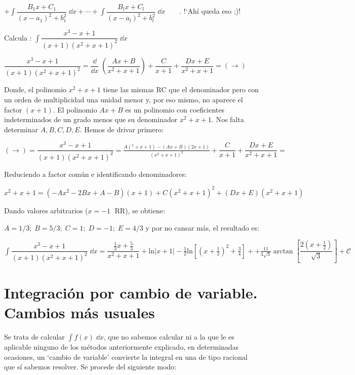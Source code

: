 {$\displaystyle +\int \dfrac {B_1x+C_1}{ (x-a_1)^2+b_1^2 } \; \dd x + \cdots + \int \dfrac {B_lx+C_l} {(x-a_l)^2+b_l^2}  \; \dd x \qquad $. \textcolor{gris}{!`Ahí queda eso ;)!}

\begin{ejem}
Calcula : $\displaystyle \int \dfrac {x^3-x+1}{(x+1)(x^2+x+1)^2} \; \dd x$	

\vspace{3mm}
$\displaystyle \dfrac {x^3-x+1}{(x+1)(x^2+x+1)^2}=\dfrac {\dd }{\dd x}\; \left( \dfrac {Ax+B}{x^2+x+1} \right) + \dfrac {C}{x+1} + \dfrac {Dx+E}{x^2+x+1}  = (\to) $

Donde, el polinomio $x^2+x+1$ tiene las mismas RC que el denominador pero con un orden de multiplicidad una unidad menor y, por eso mismo, no aparece el factor $(x+1)$. El polinomio $Ax+B$ es un polinomio con coeficientes indeterminados de un grado menos que su denominador $x^2+x+1$.
Nos falta determinar $A, B, C, D, E$. Hemos de drivar primero:

$(\to )= \displaystyle \dfrac {x^3-x+1}{(x+1)(x^2+x+1)^2}=  
 \frac {A(^2+x+1)-(Ax+B)(2x+1)}{(x^2+x+1)^2}
+ \dfrac {C}{x+1} + \dfrac {Dx+E}{x^2+x+1} =$

Reduciendo a factor común e identificando denominadores:

$x^2+x+1=(-Ax^2-2Bx+A-B)(x+1)+C(x^2+x+1)^2+(Dx+E)(x^2+x+1)$

Dando valores arbitrarios ($x=-1 \;$  RR), se obtiene:

$A=1/3; \; B=5/3; \;C=1; \;D=-1; \;E=4/3$ y por no cansar más, el resultado es:

\scriptsize{ $\displaystyle \int  \dfrac {x^3-x+1}{(x+1)(x^2+x+1)^2}\; \dd x=\dfrac {\frac 1 3 x + \frac 5 3}{x^2+x+1} + \mathrm{ln}|x+1| - \frac 1 2 \mathrm{ln} \left[ \left( x+\frac 1 2  \right)^2 + \frac 3 4  \right] + \displaystyle +\frac {11}{3\sqrt{3}} \arctan \left[ \dfrac {2\left( x + \frac 1 2 \right)}{\sqrt{3}}  \right] + \mathcal C $}

\end{ejem}

\section{Integración por cambio de variable. Cambios más usuales}

Se trata de calcular $\displaystyle \int f(x) \; \dd x$, que no sabemos calcular ni a la que le es aplicable ninguno de los métodos anteriormente explicado, en determinadas ocasiones, un `cambio de variable' convierte la integral en una de tipo racional que sí sabemos resolver. Se procede del siguiente modo:

}
